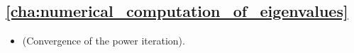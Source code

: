 \subsection*{\cref{cha:numerical_computation_of_eigenvalues}}%

\begin{itemize}
    \item {} (Convergence of the power iteration).
\end{itemize}

